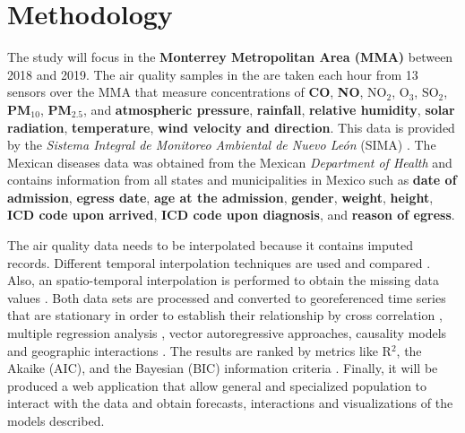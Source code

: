 \documentclass[
  11pt,
  a4paper,
  oneside
]{article}
\begin{document}
\section{Methodology}
The study will focus in the \textbf{Monterrey Metropolitan Area (MMA)} between 2018 and 2019. The air quality samples in the are taken each hour from 13 sensors over the MMA that measure concentrations of \textbf{CO}, \textbf{NO}, \textbf{$\text{NO}_2$}, \textbf{$\text{O}_3$}, \textbf{$\text{SO}_2$}, \textbf{PM$_{10}$}, \textbf{PM$_{2.5}$}, and \textbf{atmospheric pressure}, \textbf{rainfall}, \textbf{relative humidity}, \textbf{solar radiation}, \textbf{temperature}, \textbf{wind velocity and direction}. This data is provided by the \textit{Sistema Integral de Monitoreo Ambiental de Nuevo León} (SIMA) \citep{aireNL}. The Mexican diseases data was obtained from the Mexican \textit{Department of Health} \citep{egresos} and contains information from all states and municipalities in Mexico such as \textbf{date of admission}, \textbf{egress date}, \textbf{age at the admission}, \textbf{gender}, \textbf{weight}, \textbf{height}, \textbf{ICD code upon arrived}, \textbf{ICD code upon diagnosis}, and \textbf{reason of egress}.

The air quality data needs to be interpolated because it contains imputed records. Different temporal interpolation techniques are used and compared \citep{Friedman1962}. Also, an spatio-temporal interpolation is performed to obtain the missing data values \citep{LiEA2002}. Both data sets are processed and converted to georeferenced time series \citep{Wei2019} that are stationary \citep{Hyndman2018} in order to establish their relationship by cross correlation \citep{derrickEA2004}, multiple regression analysis \citep{Brockwell2002}, vector autoregressive approaches, causality models \citep{popescuEA2013} and geographic interactions \citep{ComberEA2019}. The results are ranked by metrics like R$^2$, the Akaike (AIC), and the Bayesian (BIC) information criteria \citep{Albert2007}. Finally, it will be produced a web application that allow general and specialized population to interact with the data and obtain forecasts, interactions and visualizations of the models described.
\end{document}
